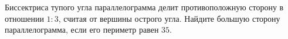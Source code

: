 \begin{ex}
	\begin{condition}
		Биссектриса тупого угла параллелограмма делит противоположную сторону в отношении \( 1 : 3 \), считая от вершины острого угла. Найдите большую сторону параллелограмма, если его периметр равен \( 35 \).
	\end{condition}
\end{ex}